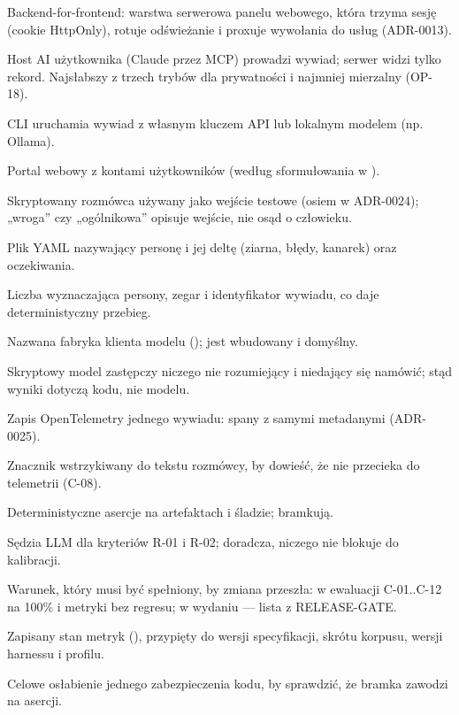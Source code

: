 \begin{description}[leftmargin=!,labelwidth=3.4cm,itemsep=3pt,style=nextline]
  \item[BFF] Backend-for-frontend: warstwa serwerowa panelu webowego, która trzyma sesję (cookie HttpOnly), rotuje odświeżanie i proxuje wywołania do usług (ADR-0013).
  \item[Tryb A] Host AI użytkownika (Claude przez MCP) prowadzi wywiad; serwer widzi tylko rekord. Najsłabszy z trzech trybów dla prywatności i najmniej mierzalny (OP-18).
  \item[Tryb B] CLI uruchamia wywiad z własnym kluczem API lub lokalnym modelem (np. Ollama).
  \item[Tryb C] Portal webowy z kontami użytkowników (według sformułowania w ).
  \item[Persona] Skryptowany rozmówca używany jako wejście testowe (osiem w ADR-0024); „wroga” czy „ogólnikowa” opisuje wejście, nie osąd o człowieku.
  \item[Scenariusz] Plik YAML nazywający personę i jej deltę (ziarna, błędy, kanarek) oraz oczekiwania.
  \item[Ziarno (seed)] Liczba wyznaczająca persony, zegar i identyfikator wywiadu, co daje deterministyczny przebieg.
  \item[Profil] Nazwana fabryka klienta modelu ();  jest wbudowany i domyślny.
  \item[Mock] Skryptowy model zastępczy niczego nie rozumiejący i niedający się namówić; stąd wyniki dotyczą kodu, nie modelu.
  \item[Ślad (trace)] Zapis OpenTelemetry jednego wywiadu: spany z samymi metadanymi (ADR-0025).
  \item[Kanarek] Znacznik wstrzykiwany do tekstu rozmówcy, by dowieść, że nie przecieka do telemetrii (C-08).
  \item[Warstwa 1] Deterministyczne asercje na artefaktach i śladzie; bramkują.
  \item[Warstwa 2] Sędzia LLM dla kryteriów R-01 i R-02; doradcza, niczego nie blokuje do kalibracji.
  \item[Bramka] Warunek, który musi być spełniony, by zmiana przeszła: w ewaluacji C-01..C-12 na 100\% i metryki bez regresu; w wydaniu --- lista z RELEASE-GATE.
  \item[Baseline] Zapisany stan metryk (), przypięty do wersji specyfikacji, skrótu korpusu, wersji harnessu i profilu.
  \item[Mutacja] Celowe osłabienie jednego zabezpieczenia kodu, by sprawdzić, że bramka zawodzi na asercji.

\end{description}
